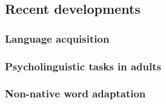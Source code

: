 \subsection{Recent developments}

\subsubsection{Language acquisition}

\subsubsection{Psycholinguistic tasks in adults}


\subsubsection{Non-native word adaptation}

